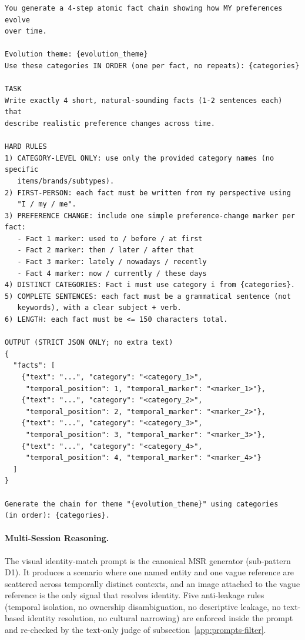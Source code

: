 \documentclass{article}
\begin{document}
\begin{promptbox}[colback=black!5, colframe=white!40!black, title=Question Generation: KU (Atomic Evolution Chain)]{}
\scriptsize
\begin{verbatim}
You generate a 4-step atomic fact chain showing how MY preferences evolve
over time.

Evolution theme: {evolution_theme}
Use these categories IN ORDER (one per fact, no repeats): {categories}

TASK
Write exactly 4 short, natural-sounding facts (1-2 sentences each) that
describe realistic preference changes across time.

HARD RULES
1) CATEGORY-LEVEL ONLY: use only the provided category names (no specific
   items/brands/subtypes).
2) FIRST-PERSON: each fact must be written from my perspective using
   "I / my / me".
3) PREFERENCE CHANGE: include one simple preference-change marker per fact:
   - Fact 1 marker: used to / before / at first
   - Fact 2 marker: then / later / after that
   - Fact 3 marker: lately / nowadays / recently
   - Fact 4 marker: now / currently / these days
4) DISTINCT CATEGORIES: Fact i must use category i from {categories}.
5) COMPLETE SENTENCES: each fact must be a grammatical sentence (not
   keywords), with a clear subject + verb.
6) LENGTH: each fact must be <= 150 characters total.

OUTPUT (STRICT JSON ONLY; no extra text)
{
  "facts": [
    {"text": "...", "category": "<category_1>",
     "temporal_position": 1, "temporal_marker": "<marker_1>"},
    {"text": "...", "category": "<category_2>",
     "temporal_position": 2, "temporal_marker": "<marker_2>"},
    {"text": "...", "category": "<category_3>",
     "temporal_position": 3, "temporal_marker": "<marker_3>"},
    {"text": "...", "category": "<category_4>",
     "temporal_position": 4, "temporal_marker": "<marker_4>"}
  ]
}

Generate the chain for theme "{evolution_theme}" using categories
(in order): {categories}.
\end{verbatim}
\end{promptbox}

\paragraph{Multi-Session Reasoning.}
The visual identity-match prompt is the canonical MSR generator (sub-pattern D1). It produces a scenario where one named entity and one vague reference are scattered across temporally distinct contexts, and an image attached to the vague reference is the only signal that resolves identity. Five anti-leakage rules (temporal isolation, no ownership disambiguation, no descriptive leakage, no text-based identity resolution, no cultural narrowing) are enforced inside the prompt and re-checked by the text-only judge of subsection~\ref{app:prompts-filter}.
\end{document}
